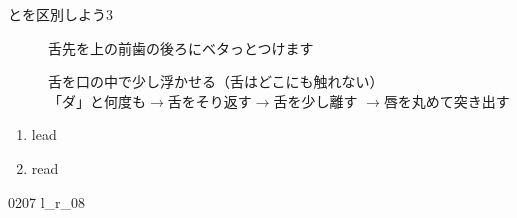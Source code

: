 \documentclass[aspectratio=169, xcolor={dvipsnames,table}]{beamer}
\begin{document}
\begin{frame}[plain]{とを区別しよう3}
  \begin{description}
    \item[] 舌先を上の前歯の後ろにベタっとつけます

    \item[] 舌を口の中で少し浮かせる（舌はどこにも触れない）\\ 「ダ」と何度も$\rightarrow$舌をそり返す$\rightarrow$舌を少し離す%
          $\rightarrow$唇を丸めて突き出す
  \end{description}

  \Large

  \begin{enumerate}
    \item lead\hfill{}\hspace{250pt}\mbox{}

    \item read\hfill{}\hspace{250pt}\mbox{}
  \end{enumerate}
  \hfill\hfill{\tiny 0207}\,{\scriptsize {}}\,{\tiny l\_r\_08}
\end{frame}
\end{document}
